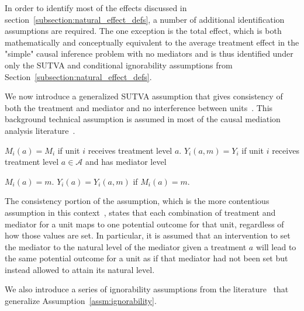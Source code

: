 In order to identify most of the effects discussed in section~\ref{subsection:natural_effect_defs}, a number of 
additional identification assumptions are required. The one exception is the total effect, which is both mathematically 
and conceptually equivalent to the average treatment effect in the "simple" causal inference problem with no mediators 
and is thus identified under only the SUTVA and conditional ignorability assumptions 
from Section~\ref{subsection:natural_effect_defs}. 

We now introduce a generalized SUTVA assumption that gives consistency of both the treatment and mediator and 
no interference between units~\citep{imaietal2013}. This background technical assumption is assumed in most of the 
causal mediation analysis literature~\citep{pearl2001,imaietal2010a}.

\begin{assumption}[Consistency]\label{assm:composition}
$M_{i}(a) = M_{i}$ if unit $i$ receives treatment level $a$. 
$Y_{i}(a,m) = Y_{i}$ if unit $i$ receives treatment level $a \in \mathcal{A}$ and 
has mediator level
\end{assumption}

\begin{assumption}[Composition]\label{assm:composition}
$M_{i}(a) = m$. $Y_{i}(a) = Y_{i}(a,m)$ if $M_{i}(a) = m$. 
\end{assumption}

The consistency portion of the assumption, which is the more contentious assumption in this context~\citep{imaietal2013}, 
states that each combination of treatment and mediator for a unit maps to one potential outcome for that unit, 
regardless of how those values are set. In particular, it is assumed that an intervention to set the mediator to the 
natural level of the mediator given a treatment $a$ will lead to the same potential outcome for a unit as if that 
mediator had not been set but instead allowed to attain its natural level. 


We also introduce a series of ignorability assumptions from the literature~\cite{pearl2001,imaietal2010a} that generalize
Assumption~\ref{assm:ignorability}.

